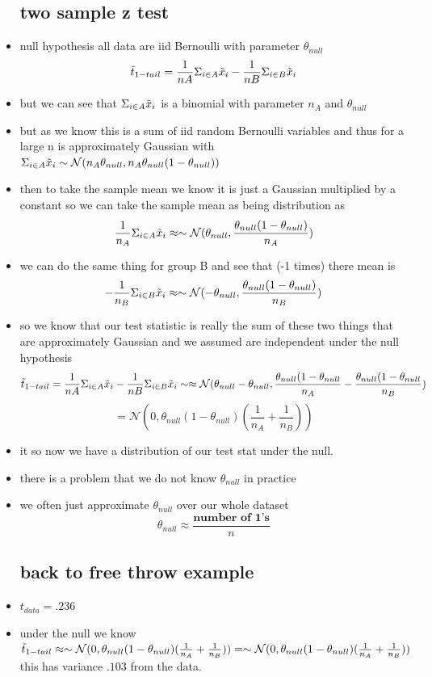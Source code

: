 \documentclass{article}
\begin{document}
\begin{itemize}
\subsection{two sample z test }
\item null hypothesis all data are iid Bernoulli with parameter $\theta_{null}$
$$\Tilde{t}_{1-tail}=\frac{1}{nA}\Sigma_{i\in A}\Tilde{x}_i-\frac{1}{nB}\Sigma_{i\in B}\Tilde{x}_i$$
\item but we can see that $\Sigma_{i\in A}\Tilde{x}_i$ is a binomial with parameter $n_A$ and $\theta_{null}$
\item but as we know this 
is a sum of iid random Bernoulli variables and thus for a large n is approximately Gaussian with  $\Sigma_{i\in A}\Tilde{x}_i\sim \mathcal{N}(n_A\theta_{null},n_{A}\theta_{null}(1-\theta_{null}))$ 
\item then to take the sample mean we know it is just a Gaussian multiplied by a constant so we can take the sample mean as being distribution as $$\frac{1}{n_{A}}\Sigma_{i\in A}\Tilde{x}_i\approx \sim \mathcal{N}(\theta_{null},\frac{\theta_{null}(1-\theta_{null})}{n_{A}})$$ 
\item we can do the same thing for group B and see that (-1 times) there mean is $$-\frac{1}{n_{B}}\Sigma_{i\in B}\Tilde{x}_i\approx \sim \mathcal{N}(-\theta_{null},\frac{\theta_{null}(1-\theta_{null})}{n_{B}})$$ 
\item so we know that our test statistic is really the sum of these two things that are approximately Gaussian and we assumed are independent under the null hypothesis $$\Tilde{t}_{1-tail}=\frac{1}{nA}\Sigma_{i\in A}\Tilde{x}_i-\frac{1}{nB}\Sigma_{i\in B}\Tilde{x}_i\\\sim \approx\mathcal{N}(\theta_{null}-\theta_{null}, \frac{\theta_{null}(1-\theta_{null}}{n_A}-\frac{\theta_{null}(1-\theta_{null}}{n_B})$$ $$=\mathcal{N}(0, \theta_{null}(1-\theta_{null})(\frac{1}{n_A}+\frac{1}{n_B}))$$
\item it so now we have a distribution of our test stat under the null. 
\item there is a problem that we do not know $\theta_{null}$ in practice
\item we often just approximate $\theta_{null}$ over our whole dataset $$\theta_{null}\approx\frac{\textbf{number of 1's}}{n}$$
\subsection{back to free throw example}
\item $t_{data}=.236$
\item under the null we know  $\Tilde{t}_{1-tail}\approx\sim\mathcal{N}(0, \theta_{null}(1-\theta_{null})(\frac{1}{n_A}+\frac{1}{n_B}))=\sim\mathcal{N}(0, \theta_{null}(1-\theta_{null})(\frac{1}{n_A}+\frac{1}{n_B}))$ this has variance $.103$ from the data. 

\end{itemize}
\end{document}
